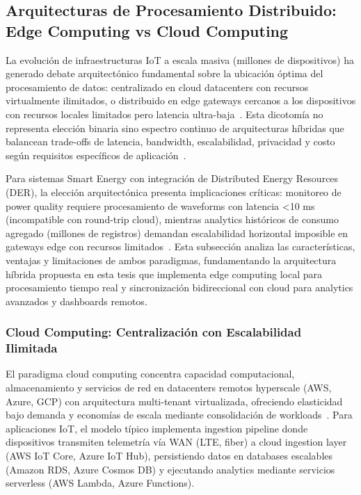 
\subsection{Arquitecturas de Procesamiento Distribuido: Edge Computing vs Cloud Computing}
\label{sec:edge-vs-cloud}

La evolución de infraestructuras IoT a escala masiva (millones de dispositivos) ha generado debate arquitectónico fundamental sobre la ubicación óptima del procesamiento de datos: centralizado en cloud datacenters con recursos virtualmente ilimitados, o distribuido en edge gateways cercanos a los dispositivos con recursos locales limitados pero latencia ultra-baja~\cite{andriuloEdgeComputingCloud2024,minhEdgeComputingIoTEnabled2022}. Esta dicotomía no representa elección binaria sino espectro continuo de arquitecturas híbridas que balancean trade-offs de latencia, bandwidth, escalabilidad, privacidad y costo según requisitos específicos de aplicación~\cite{andriuloEdgeComputingCloud2024}.

Para sistemas Smart Energy con integración de Distributed Energy Resources (DER), la elección arquitectónica presenta implicaciones críticas: monitoreo de power quality requiere procesamiento de waveforms con latencia <10 ms (incompatible con round-trip cloud), mientras analytics históricos de consumo agregado (millones de registros) demandan escalabilidad horizontal imposible en gateways edge con recursos limitados~\cite{minhEdgeComputingIoTEnabled2022}. Esta subsección analiza las características, ventajas y limitaciones de ambos paradigmas, fundamentando la arquitectura híbrida propuesta en esta tesis que implementa edge computing local para procesamiento tiempo real y sincronización bidireccional con cloud para analytics avanzados y dashboards remotos.

\subsubsection{Cloud Computing: Centralización con Escalabilidad Ilimitada}

El paradigma cloud computing concentra capacidad computacional, almacenamiento y servicios de red en datacenters remotos hyperscale (AWS, Azure, GCP) con arquitectura multi-tenant virtualizada, ofreciendo elasticidad bajo demanda y economías de escala mediante consolidación de workloads~\cite{andriuloEdgeComputingCloud2024}. Para aplicaciones IoT, el modelo típico implementa ingestion pipeline donde dispositivos transmiten telemetría vía WAN (LTE, fiber) a cloud ingestion layer (AWS IoT Core, Azure IoT Hub), persistiendo datos en databases escalables (Amazon RDS, Azure Cosmos DB) y ejecutando analytics mediante servicios serverless (AWS Lambda, Azure Functions).

